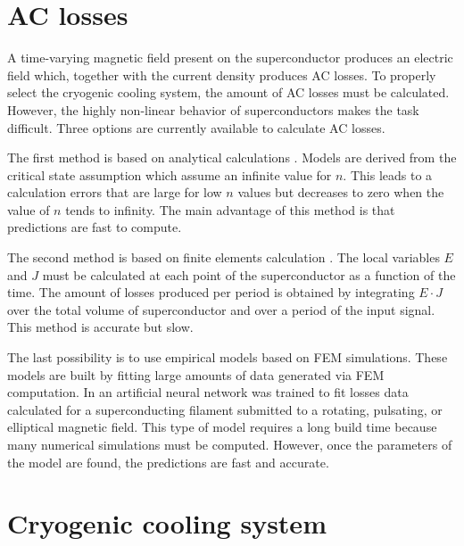 \documentclass{ws-jmrr}
\begin{document}
\begin{multicols}{2}
\section{AC losses}
\label{ac}
A time-varying magnetic field present on the superconductor produces an electric field which, together with the current density produces AC losses. To properly select the cryogenic cooling system, the amount of AC losses must be calculated. However, the highly non-linear behavior of superconductors makes the task difficult. Three options are currently available to calculate AC losses.\par
The first method is based on analytical calculations \cite{0022-3727-3-4-308}. Models are derived from the critical state assumption which assume an infinite value for $n$. This leads to a calculation errors that are large for low $n$ values but decreases to zero when the value of $n$ tends to infinity. The main advantage of this method is that predictions are fast to compute.\par
The second method is based on finite elements calculation \cite{brambilla2006development}. The local variables $E$ and $J$ must be calculated at each point of the superconductor as a function of the time. The amount of losses produced per period is obtained by integrating $E\cdot J$ over the total volume of superconductor and over a period of the input signal. This method is accurate but slow.\par
The last possibility is to use empirical models based on FEM simulations. These models are built by fitting large amounts of data generated via FEM computation. In \cite{leclerc2016artificial} an artificial neural network was trained to fit losses data calculated for a superconducting filament submitted to a rotating, pulsating, or elliptical magnetic field. This type of model requires a long build time because many numerical simulations must be computed. However, once the parameters of the model are found, the predictions are fast and accurate.

\section{Cryogenic cooling system}


\end{multicols}
\end{document}
